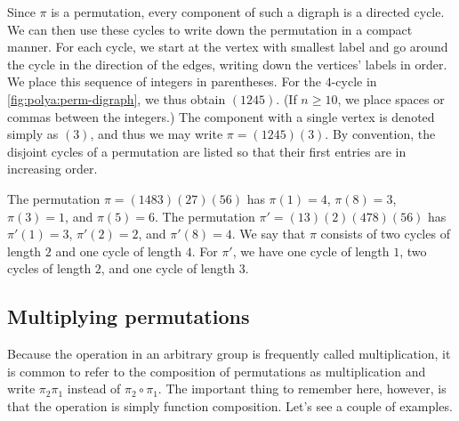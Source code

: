 Since $\pi$ is a permutation, every component of such a digraph is a
directed cycle. We can then use these cycles to write down the
permutation in a compact manner. For each cycle, we start at the
vertex with smallest label and go around the cycle in the direction of
the edges, writing down the vertices' labels in order. We place this
sequence of integers in parentheses. For the $4$-cycle in
\autoref{fig:polya:perm-digraph}, we thus obtain $(1245)$. (If $n\geq
10$, we place spaces or commas between the integers.) The component
with a single vertex is denoted simply as $(3)$, and thus we may write
$\pi=(1245)(3)$. By convention, the disjoint cycles of a permutation
are listed so that their first entries are in increasing order.

\begin{example}
  The permutation $\pi=(1483)(27)(56)$ has $\pi(1)=4$,
  $\pi(8)=3$, $\pi(3)=1$, and $\pi(5)=6$. The permutation
  $\pi'=(13)(2)(478)(56)$ has $\pi'(1)=3$, $\pi'(2) = 2$, and
  $\pi'(8)=4$. We say that $\pi$ consists of two cycles of length $2$
  and one cycle of length $4$. For $\pi'$, we have one cycle of length
  $1$, two cycles of length $2$, and one cycle of length $3$.
\end{example}

\subsection{Multiplying permutations}\label{ss:polya:perm-groups:mult}

Because the operation in an arbitrary group is frequently called
multiplication, it is common to refer to the composition of
permutations as multiplication and write $\pi_2\pi_1$ instead of
$\pi_2\circ \pi_1$. The important thing to remember here, however, is
that the operation is simply function composition. Let's see a couple
of examples.

